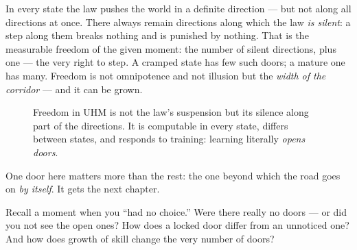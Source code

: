 \documentclass[11pt,letterpaper]{article}
\newcommand{\stT}{\textbf{[T]}\xspace}
\begin{document}
In every state the law pushes the world in a definite direction ---
but not along all directions at once. There always remain directions
along which the law \emph{is silent}: a step along them breaks
nothing and is punished by nothing. That is the measurable freedom
of the given moment: the number of silent directions, plus one ---
the very right to step. A cramped state has few such doors; a mature
one has many. Freedom is not omnipotence and not illusion but the
\emph{width of the corridor} --- and it can be grown.

\begin{figure}[H]
\centering
{}
\caption{Freedom in UHM is not the law's suspension but its silence
along part of the directions. It is computable in every state,
differs between states, and responds to training: learning literally
\emph{opens doors}.}
\label{fig:doors}
\end{figure}

One door here matters more than the rest: the one beyond which the
road goes on \emph{by itself}. It gets the next chapter.

\begin{askbox}
Recall a moment when you ``had no choice.'' Were there really no
doors --- or did you not see the open ones? How does a locked door
differ from an unnoticed one? And how does growth of skill change
the very number of doors?
\end{askbox}

\end{document}
